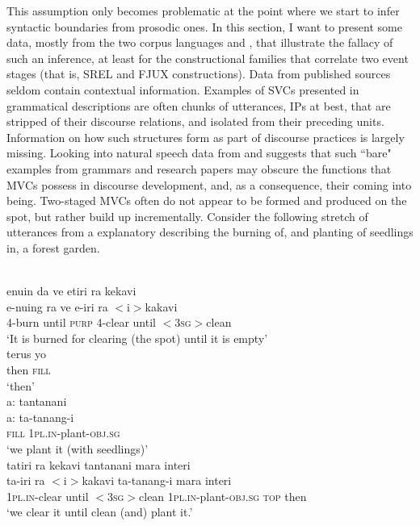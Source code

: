 This assumption only becomes problematic at the point where we start to infer syntactic boundaries from prosodic ones. In this section, I want to present some data, mostly from the two corpus languages  and , that illustrate the fallacy of such an inference, at least for the constructional families that correlate two event stages (that is, SREL and FJUX constructions). Data from published sources seldom contain contextual information. Examples of SVCs presented in grammatical descriptions are often chunks of utterances, IPs at best, that are stripped of their discourse relations, and isolated from their preceding units. Information on how such structures form as part of discourse practices is largely missing. Looking into natural speech data from  and  suggests that such ``bare" examples from grammars and research papers may obscure the functions that MVCs possess in discourse development, and, as a consequence, their coming into being. Two-staged MVCs often do not appear to be formed and produced on the spot, but rather build up incrementally. Consider the following stretch of utterances from a  explanatory describing the burning of, and planting of seedlings in, a forest garden.  

\ea \label{Wooi_gardening1}
\\
\ea 
\glll enuin da ve etiri ra kekavi \\
e-nuing ra ve e-iri ra $<$i$>$kakavi \\
\textsc{4}-burn until \textsc{purp} \textsc{4}-clear until $<$\textsc{3}\textsc{sg}$>$clean \\
\glft `It is burned for clearing (the spot) until it is empty' \\ 
\ex
\gll terus yo \\
then \textsc{fill} \\
\glft `then' \\ 
\ex
\glll a: tantanani \\
a: ta-tanang-i \\
\textsc{fill} \textsc{1}\textsc{pl}.\textsc{in}-plant-\textsc{obj}.\textsc{sg} \\
\glft `we plant it (with seedlings)' \\ 
\ex
\glll tatiri ra kekavi tantanani mara interi \\ 
ta-iri ra $<$i$>$kakavi ta-tanang-i mara interi \\
\textsc{1}\textsc{pl}.\textsc{in}-clear until $<$\textsc{3}\textsc{sg}$>$clean \textsc{1}\textsc{pl}.\textsc{in}-plant-\textsc{obj}.\textsc{sg} \textsc{top} then \\
\glft `we clear it until clean (and) plant it.'\\ 
\z
\z

